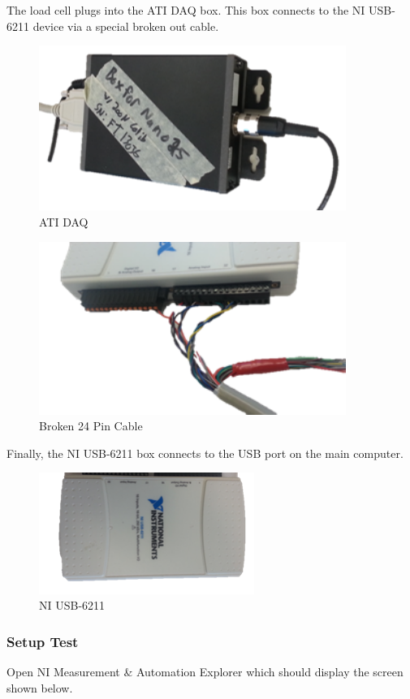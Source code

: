 \documentclass[pdftex,11pt,letterpaper]{article}
\begin{document}
The load cell plugs into the ATI DAQ box. This box connects to the NI USB-6211 device via a special broken out cable. \\


\begin{figure}[ht!]
\centering
\includegraphics[width=100mm]{./images/nano25}
\caption{ATI DAQ}
\end{figure}

\begin{figure}[ht!]
\centering
\includegraphics[width=100mm]{./images/broke}
\caption{Broken 24 Pin Cable}
\end{figure}

Finally, the NI USB-6211 box connects to the USB port on the main computer.

\begin{figure}[ht!]
\centering
\includegraphics[width=70mm]{./images/usb}
\caption{NI USB-6211}
\end{figure}

\subsubsection{Setup Test}
Open NI Measurement \& Automation Explorer which should display the screen shown below.\\
\end{document}
